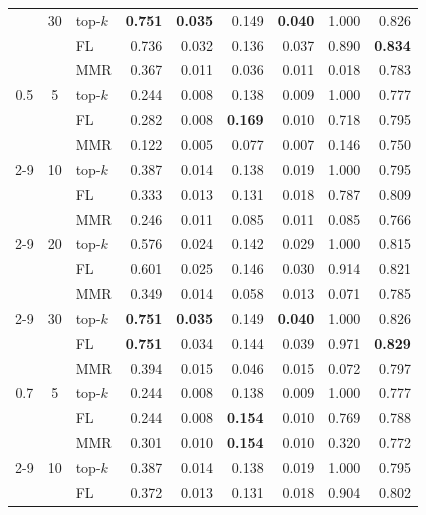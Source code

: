 \documentclass[11pt,a4paper]{article}
\begin{document}
\begin{longtable}{@{}cclrrrrrr@{}}
	& 30 & top-$k$ & \textbf{0.751} & \textbf{0.035} & 0.149 & \textbf{0.040} & 1.000 & 0.826 \\
	&    & FL      & 0.736 & 0.032 & 0.136 & 0.037 & 0.890 & \textbf{0.834} \\
	&    & MMR     & 0.367 & 0.011 & 0.036 & 0.011 & 0.018 & 0.783 \\
	\midrule
	0.5 & 5  & top-$k$ & 0.244 & 0.008 & 0.138 & 0.009 & 1.000 & 0.777 \\
	&    & FL      & 0.282 & 0.008 & \textbf{0.169} & 0.010 & 0.718 & 0.795 \\
	&    & MMR     & 0.122 & 0.005 & 0.077 & 0.007 & 0.146 & 0.750 \\
	\cmidrule(l){2-9}
	& 10 & top-$k$ & 0.387 & 0.014 & 0.138 & 0.019 & 1.000 & 0.795 \\
	&    & FL      & 0.333 & 0.013 & 0.131 & 0.018 & 0.787 & 0.809 \\
	&    & MMR     & 0.246 & 0.011 & 0.085 & 0.011 & 0.085 & 0.766 \\
	\cmidrule(l){2-9}
	& 20 & top-$k$ & 0.576 & 0.024 & 0.142 & 0.029 & 1.000 & 0.815 \\
	&    & FL      & 0.601 & 0.025 & 0.146 & 0.030 & 0.914 & 0.821 \\
	&    & MMR     & 0.349 & 0.014 & 0.058 & 0.013 & 0.071 & 0.785 \\
	\cmidrule(l){2-9}
	& 30 & top-$k$ & \textbf{0.751} & \textbf{0.035} & 0.149 & \textbf{0.040} & 1.000 & 0.826 \\
	&    & FL      & \textbf{0.751} & 0.034 & 0.144 & 0.039 & 0.971 & \textbf{0.829} \\
	&    & MMR     & 0.394 & 0.015 & 0.046 & 0.015 & 0.072 & 0.797 \\
	\midrule
	0.7 & 5  & top-$k$ & 0.244 & 0.008 & 0.138 & 0.009 & 1.000 & 0.777 \\
	&    & FL      & 0.244 & 0.008 & \textbf{0.154} & 0.010 & 0.769 & 0.788 \\
	&    & MMR     & 0.301 & 0.010 & \textbf{0.154} & 0.010 & 0.320 & 0.772 \\
	\cmidrule(l){2-9}
	& 10 & top-$k$ & 0.387 & 0.014 & 0.138 & 0.019 & 1.000 & 0.795 \\
	&    & FL      & 0.372 & 0.013 & 0.131 & 0.018 & 0.904 & 0.802 \\

\end{longtable}
\end{document}
